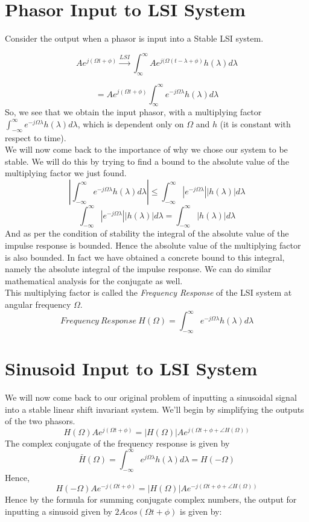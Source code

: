   
\section{Phasor Input to LSI System}
Consider the output when a phasor is input into a Stable LSI system.

\[
Ae^{j(\Omega t + \phi)} \xrightarrow{LSI} 
 \int_{\infty}^{\infty}Ae^{j(\Omega (t - \lambda + \phi)}h(\lambda)d\lambda
\]
 
\[ =
Ae^{j(\Omega t + \phi)} \int_{\infty}^{\infty}{e^{-j\Omega\lambda}h(\lambda)d\lambda}
\]
So, we see that we obtain the input phasor, with a multiplying factor $\int_{-\infty}^{\infty}{e^{-j\Omega\lambda}h(\lambda)d\lambda}$, which is dependent only on $\Omega$ and $h$ (it is constant with respect to time).\\
We will now come back to the importance of why we chose our system to be stable. We will do this by trying to find a bound to the absolute value of the multiplying factor we just found.
\[
| \int_{-\infty}^{\infty}{e^{-j\Omega\lambda}h(\lambda)d\lambda} | \leq 
\int_{-\infty}^{\infty} { |e^{-j\Omega\lambda}||h(\lambda)| d\lambda }
\]
\[
\int_{-\infty}^{\infty} { |e^{-j\Omega\lambda}||h(\lambda)| d\lambda } =
\int_{-\infty}^{\infty} {|h(\lambda)| d\lambda }
\]
And as per the condition of stability the integral of the absolute value of the impulse response is bounded. Hence the absolute value of the multiplying factor is also bounded. In fact we have obtained a concrete bound to this integral, namely the absolute integral of the impulse response. We can do similar mathematical analysis for the conjugate as well.\\
This multiplying factor is called the \textit{Frequency Response} of the LSI system at angular frequency $\Omega$.
\[
	Frequency\ Response\ H(\Omega) = \int_{-\infty}^{\infty}{e^{-j\Omega\lambda}h(\lambda)d\lambda}
\] 


\section{Sinusoid Input to LSI System}

We will now come back to our original problem of inputting a sinusoidal signal into a stable linear shift invariant system. We'll begin by simplifying the outputs of the two phasors.
\[
	H(\Omega)Ae^{j(\Omega t + \phi)} = |H(\Omega)|Ae^{j(\Omega t + \phi +  \angle  H(\Omega))}
\]
The complex conjugate of the frequency response is given by
\[
\bar{H}(\Omega) = \int_{-\infty}^{\infty}{e^{j\Omega\lambda}h(\lambda)d\lambda} = H(-\Omega)
\]
Hence,
\[
H(-\Omega)Ae^{-j(\Omega t + \phi)} = |H(\Omega)|Ae^{-j(\Omega t + \phi +  \angle  H(\Omega))}
\]
Hence by the formula for summing conjugate complex numbers, the output for inputting a sinusoid given by $2Acos(\Omega t + \phi)$ is given by:


